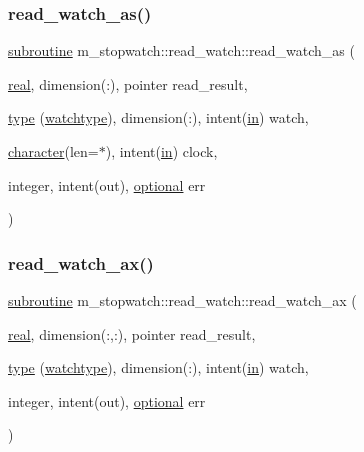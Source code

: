 \subsubsection{\texorpdfstring{read\+\_\+watch\+\_\+as()}{read\_watch\_as()}}
{\footnotesize\ttfamily \hyperlink{M__stopwatch_83_8txt_acfbcff50169d691ff02d4a123ed70482}{subroutine} m\+\_\+stopwatch\+::read\+\_\+watch\+::read\+\_\+watch\+\_\+as (\begin{DoxyParamCaption}\item[{\hyperlink{read__watch_83_8txt_abdb62bde002f38ef75f810d3a905a823}{real}, dimension(\+:), pointer}]{read\+\_\+result,  }\item[{\hyperlink{stop__watch_83_8txt_a70f0ead91c32e25323c03265aa302c1c}{type} (\hyperlink{structm__stopwatch_1_1watchtype}{watchtype}), dimension(\+:), intent(\hyperlink{M__journal_83_8txt_afce72651d1eed785a2132bee863b2f38}{in})}]{watch,  }\item[{\hyperlink{option__stopwatch_83_8txt_abd4b21fbbd175834027b5224bfe97e66}{character}(len=$\ast$), intent(\hyperlink{M__journal_83_8txt_afce72651d1eed785a2132bee863b2f38}{in})}]{clock,  }\item[{integer, intent(out), \hyperlink{option__stopwatch_83_8txt_aa4ece75e7acf58a4843f70fe18c3ade5}{optional}}]{err }\end{DoxyParamCaption})\hspace{0.3cm}{\ttfamily [private]}}

\mbox{\label{interfacem__stopwatch_1_1read__watch_a1db6c4e1d66e176144333144958d2c8e}} 
\subsubsection{\texorpdfstring{read\+\_\+watch\+\_\+ax()}{read\_watch\_ax()}}
{\footnotesize\ttfamily \hyperlink{M__stopwatch_83_8txt_acfbcff50169d691ff02d4a123ed70482}{subroutine} m\+\_\+stopwatch\+::read\+\_\+watch\+::read\+\_\+watch\+\_\+ax (\begin{DoxyParamCaption}\item[{\hyperlink{read__watch_83_8txt_abdb62bde002f38ef75f810d3a905a823}{real}, dimension(\+:,\+:), pointer}]{read\+\_\+result,  }\item[{\hyperlink{stop__watch_83_8txt_a70f0ead91c32e25323c03265aa302c1c}{type} (\hyperlink{structm__stopwatch_1_1watchtype}{watchtype}), dimension(\+:), intent(\hyperlink{M__journal_83_8txt_afce72651d1eed785a2132bee863b2f38}{in})}]{watch,  }\item[{integer, intent(out), \hyperlink{option__stopwatch_83_8txt_aa4ece75e7acf58a4843f70fe18c3ade5}{optional}}]{err }\end{DoxyParamCaption})\hspace{0.3cm}{\ttfamily [private]}}

